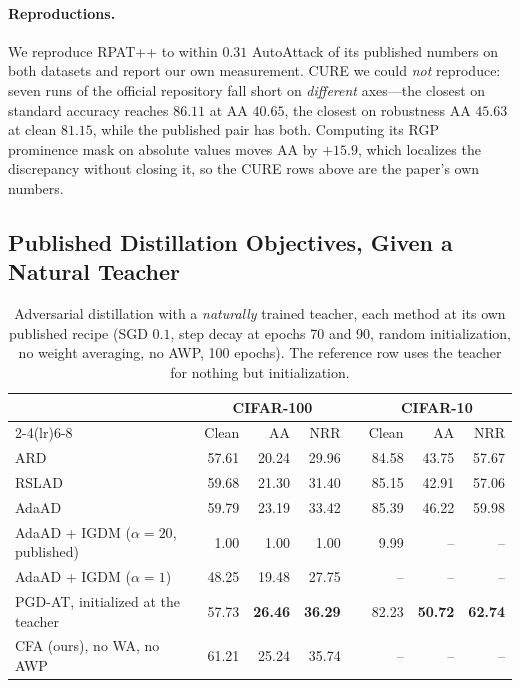 \paragraph{Reproductions.} We reproduce RPAT++ to within $0.31$ AutoAttack of its published numbers on
both datasets and report our own measurement. CURE we could \emph{not} reproduce: seven runs of the
official repository fall short on \emph{different} axes---the closest on standard accuracy reaches
$86.11$ at AA $40.65$, the closest on robustness AA $45.63$ at clean $81.15$, while the published pair
has both. Computing its RGP prominence mask on absolute values moves AA by $+15.9$, which localizes the
discrepancy without closing it, so the CURE rows above are the paper's own numbers.

\subsection{Published Distillation Objectives, Given a Natural Teacher}
\label{sec:natteacher}

\begin{table}[t]
  \centering
  \caption{Adversarial distillation with a \emph{naturally} trained teacher, each method at its own
  published recipe (SGD $0.1$, step decay at epochs 70 and 90, random initialization, no weight
  averaging, no AWP, 100 epochs). The reference row uses the teacher for nothing but initialization.}
  \label{tab:natteacher}
  \begin{tabular}{lrrrcrrr}
    \toprule
    & \multicolumn{3}{c}{CIFAR-100} & & \multicolumn{3}{c}{CIFAR-10} \\
    \cmidrule(lr){2-4}\cmidrule(lr){6-8}
    & Clean & AA & NRR & & Clean & AA & NRR \\
    \midrule
    ARD                                  & 57.61 & 20.24 & 29.96 & & 84.58 & 43.75 & 57.67 \\
    RSLAD                                & 59.68 & 21.30 & 31.40 & & 85.15 & 42.91 & 57.06 \\
    AdaAD                                & 59.79 & 23.19 & 33.42 & & 85.39 & 46.22 & 59.98 \\
    AdaAD + IGDM ($\alpha=20$, published)&  1.00 &  1.00 &  1.00 & &  9.99 & --    & --    \\
    AdaAD + IGDM ($\alpha=1$)            & 48.25 & 19.48 & 27.75 & & --    & --    & --    \\
    \midrule
    PGD-AT, initialized at the teacher   & 57.73 & \textbf{26.46} & \textbf{36.29} & & 82.23 & \textbf{50.72} & \textbf{62.74} \\
    CFA (ours), no WA, no AWP            & 61.21 & 25.24 & 35.74 & & -- & -- & -- \\
    \bottomrule
  \end{tabular}
\end{table}

